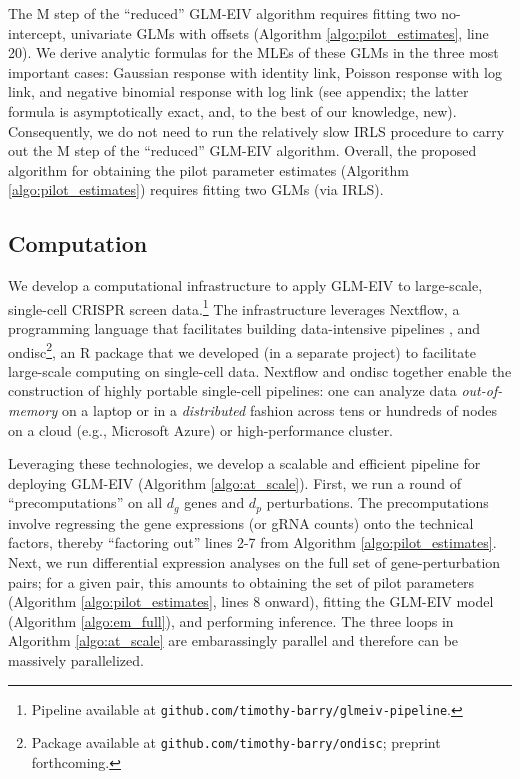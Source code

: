 \documentclass[12pt]{article}
\begin{document}
The M step of the ``reduced'' GLM-EIV algorithm requires fitting two no-intercept, univariate GLMs with offsets (Algorithm \ref{algo:pilot_estimates}, line 20). We derive analytic formulas for the MLEs of these GLMs in the three most important cases: Gaussian response with identity link, Poisson response with log link, and negative binomial response with log link (see appendix; the latter formula is asymptotically exact, and, to the best of our knowledge, new). Consequently, we do not need to run the relatively slow IRLS procedure to carry out the M step of the ``reduced'' GLM-EIV algorithm. Overall, the proposed algorithm for obtaining the pilot parameter estimates (Algorithm \ref{algo:pilot_estimates}) requires fitting two GLMs (via IRLS).

\subsection{Computation}
We develop a computational infrastructure to apply GLM-EIV to large-scale, single-cell CRISPR screen data.\footnote{Pipeline available at \texttt{github.com/timothy-barry/glmeiv-pipeline}.} The infrastructure leverages Nextflow, a programming language that facilitates building data-intensive pipelines \cite{DITommaso2017}, and ondisc\footnote{Package available at \texttt{github.com/timothy-barry/ondisc}; preprint forthcoming.}, an R package that we developed (in a separate project) to facilitate large-scale computing on single-cell data. Nextflow and ondisc together enable the construction of highly portable single-cell pipelines: one can analyze data \textit{out-of-memory} on a laptop or in a \textit{distributed} fashion across tens or hundreds of nodes on a cloud (e.g., Microsoft Azure) or high-performance cluster.

Leveraging these technologies, we develop a scalable and efficient pipeline for deploying GLM-EIV (Algorithm \ref{algo:at_scale}). First, we run a round of ``precomputations'' on all $d_g$ genes and $d_p$ perturbations. The precomputations involve regressing the gene expressions (or gRNA counts) onto the technical factors, thereby ``factoring out'' lines 2-7 from Algorithm \ref{algo:pilot_estimates}. Next, we run differential expression analyses on the full set of gene-perturbation pairs; for a given pair, this amounts to obtaining the set of pilot parameters (Algorithm \ref{algo:pilot_estimates}, lines 8 onward), fitting the GLM-EIV model (Algorithm \ref{algo:em_full}), and performing inference. The three loops in Algorithm \ref{algo:at_scale} are embarassingly parallel and therefore can be massively parallelized. 
\end{document}
